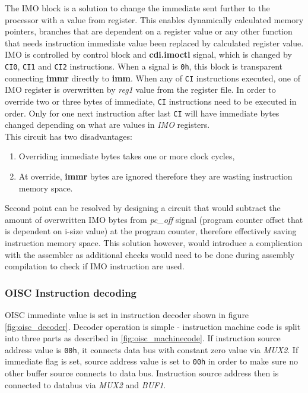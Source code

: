 The IMO block is a solution to change the immediate sent further to the processor with a value from register. This enables dynamically calculated memory pointers, branches that are dependent on a register value or any other function that needs instruction immediate value been replaced by calculated register value. IMO is controlled by control block and \textbf{cdi.imoctl} signal, which is changed by \texttt{CI0}, \texttt{CI1} and \texttt{CI2} instructions. When a signal is \texttt{0h}, this block is transparent connecting \textbf{immr} directly to \textbf{imm}. When any of \texttt{CI} instructions executed, one of IMO register is overwritten by \textit{reg1} value from the register file. In order to override two or three bytes of immediate, \texttt{CI} instructions need to be executed in order. Only for one next instruction after last \texttt{CI} will have immediate bytes changed depending on what are values in \textit{IMO} registers.
\\This circuit has two disadvantages: 
\begin{enumerate}
	\item Overriding immediate bytes takes one or more clock cycles,
	\item At override, \textbf{immr} bytes are ignored therefore they are wasting instruction memory space.
\end{enumerate}
Second point can be resolved by designing a circuit that would subtract the amount of overwritten IMO bytes from \textit{pc\_off} signal (program counter offset that is dependent on i-size value) at the program counter, therefore effectively saving instruction memory space. This solution however, would introduce a complication with the assembler as additional checks would need to be done during assembly compilation to check if IMO instruction are used.

\subsubsection{OISC Instruction decoding}
OISC immediate value is set in instruction decoder shown in figure \ref{fig:oisc_decoder}. Decoder operation is simple - instruction machine code is split into three parts as described in \ref{fig:oisc_machinecode}. If instruction source address value is \texttt{00h}, it connects data bus with constant zero value via \textit{MUX2}. If immediate flag is set, source address value is set to \texttt{00h} in order to make sure no other buffer source connects to data bus. Instruction source address then is connected to databus via \textit{MUX2} and \textit{BUF1}. 

